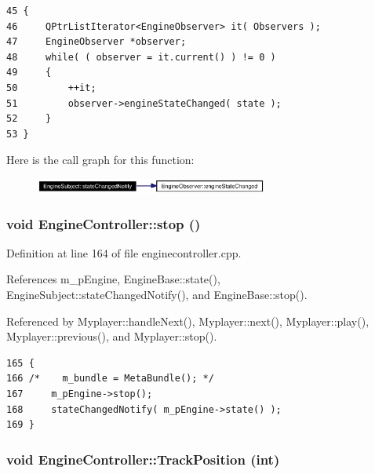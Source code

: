 \footnotesize\begin{verbatim}45 {
46     QPtrListIterator<EngineObserver> it( Observers );
47     EngineObserver *observer;
48     while( ( observer = it.current() ) != 0 )
49     {
50         ++it;
51         observer->engineStateChanged( state );
52     }
53 }
\end{verbatim}\normalsize 


Here is the call graph for this function:\begin{figure}[H]
\begin{center}
\leavevmode
\includegraphics[width=217pt]{classEngineSubject_EngineSubjectb2_cgraph}
\end{center}
\end{figure}
\subsubsection{\setlength{\rightskip}{0pt plus 5cm}void Engine\-Controller::stop ()\hspace{0.3cm}{\tt  [slot]}}\label{classEngineController_EngineControlleri5}




Definition at line 164 of file enginecontroller.cpp.

References m\_\-p\-Engine, Engine\-Base::state(), Engine\-Subject::state\-Changed\-Notify(), and Engine\-Base::stop().

Referenced by Myplayer::handle\-Next(), Myplayer::next(), Myplayer::play(), Myplayer::previous(), and Myplayer::stop().



\footnotesize\begin{verbatim}165 {
166 /*    m_bundle = MetaBundle(); */
167     m_pEngine->stop();
168     stateChangedNotify( m_pEngine->state() );  
169 }
\end{verbatim}\normalsize 
{}
\subsubsection{\setlength{\rightskip}{0pt plus 5cm}void Engine\-Controller::Track\-Position (int)\hspace{0.3cm}{\tt  [signal]}}\label{classEngineController_EngineControllerl3}




